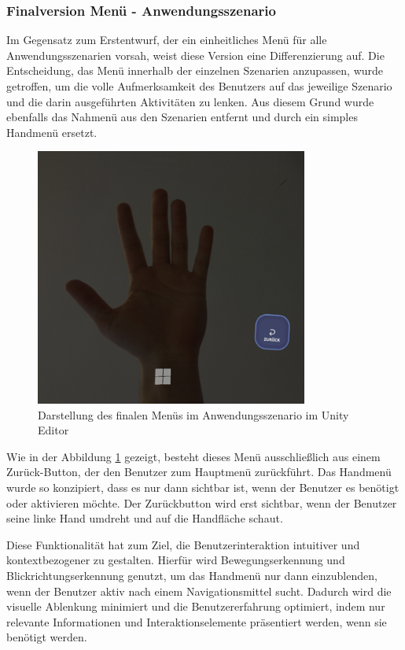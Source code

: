 \subsubsection{Finalversion Menü - Anwendungsszenario}
Im Gegensatz zum Erstentwurf, der ein einheitliches Menü für alle Anwendungsszenarien vorsah, weist diese Version eine Differenzierung auf. Die Entscheidung, das Menü innerhalb der einzelnen Szenarien anzupassen, wurde getroffen, um die volle Aufmerksamkeit des Benutzers auf das jeweilige Szenario und die darin ausgeführten Aktivitäten zu lenken. Aus diesem Grund wurde ebenfalls das Nahmenü aus den Szenarien entfernt und durch ein simples Handmenü ersetzt.

\begin{figure}[H]
    \centering
    \includegraphics[width=0.8\textwidth]{images/backbutton.png}
    \caption{Darstellung des finalen Menüs im Anwendungsszenario im Unity Editor}
    \label{fig:backbutton}
\end{figure}

Wie in der Abbildung \ref{fig:backbutton} gezeigt, besteht dieses Menü ausschließlich aus einem Zurück-Button, der den Benutzer zum Hauptmenü zurückführt. Das Handmenü wurde so konzipiert, dass es nur dann sichtbar ist, wenn der Benutzer es benötigt oder aktivieren möchte.  Der Zurückbutton wird erst sichtbar, wenn der Benutzer seine linke Hand umdreht und auf die Handfläche schaut.

Diese Funktionalität hat zum Ziel, die Benutzerinteraktion intuitiver und kontextbezogener zu gestalten. Hierfür wird Bewegungserkennung und Blickrichtungserkennung genutzt, um das Handmenü nur dann einzublenden, wenn der Benutzer aktiv nach einem Navigationsmittel sucht. Dadurch wird die visuelle Ablenkung minimiert und die Benutzererfahrung optimiert, indem nur relevante Informationen und Interaktionselemente präsentiert werden, wenn sie benötigt werden.

